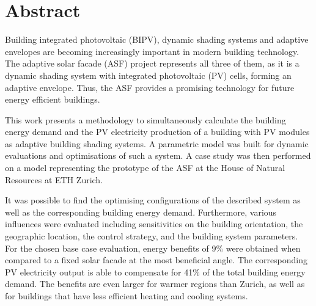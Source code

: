 \chapter*{Abstract}
Building integrated photovoltaic (BIPV), dynamic shading systems and adaptive envelopes are becoming increasingly important in modern building technology. The adaptive solar facade (ASF) project represents all three of them, as it is a dynamic shading system with integrated photovoltaic (PV) cells, forming an adaptive envelope. Thus, the ASF provides a promising technology for future energy efficient buildings. 

This work presents a methodology to simultaneously calculate the building energy demand and the PV electricity production of a building with PV modules as adaptive building shading systems. A parametric model was built for dynamic evaluations and optimisations of such a system. A case study was then performed on a model representing the prototype of the ASF at the House of Natural Resources at ETH Zurich. 

It was possible to find the optimising configurations of the described system as well as the corresponding building energy demand. Furthermore, various influences were evaluated including sensitivities on the building orientation, the geographic location, the control strategy, and the building system parameters. For the chosen base case evaluation, energy benefits of 9\% were obtained when compared to a fixed solar facade at the most beneficial angle. The corresponding PV electricity output is able to compensate for 41\% of the total building energy demand. The benefits are even larger for warmer regions than Zurich, as well as for buildings that have less efficient heating and cooling systems. 
\newpage